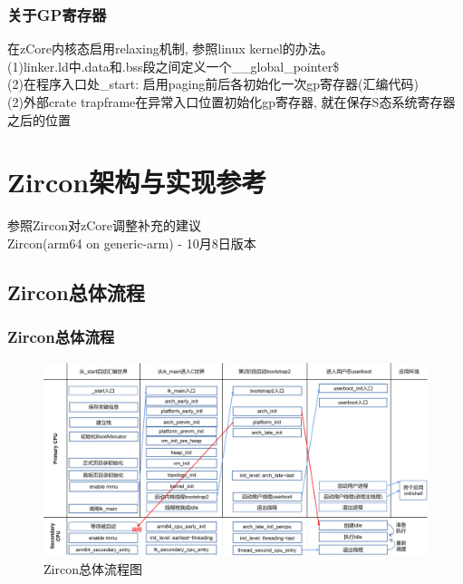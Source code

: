 \documentclass[
8pt, %
]{beamer}
\begin{document}
	\begin{frame}
		\frametitle{关于GP寄存器}
		在zCore内核态启用relaxing机制, 参照linux kernel的办法。\\
		(1)linker.ld中.data和.bss段之间定义一个\_\_global\_pointer\$\\
		(2)在程序入口处\_start: 启用paging前后各初始化一次gp寄存器(汇编代码)\\
		(2)外部crate trapframe在异常入口位置初始化gp寄存器, 就在保存S态系统寄存器之后的位置
        
        
	\end{frame}

	\section{Zircon架构与实现参考}

	\begin{frame}
		\begin{center}
			{\LARGE 参照Zircon对zCore调整补充的建议\\}
			\bigskip\bigskip
			{\large Zircon(arm64 on generic-arm) - 10月8日版本}
		\end{center}
	\end{frame}

	\subsection{Zircon总体流程}

	\begin{frame}
		\frametitle{Zircon总体流程}
		\begin{figure}
			\includegraphics[width=1.0\linewidth]{zircon_flow.png}
			\caption{Zircon总体流程图}
		\end{figure}
	\end{frame}
\end{document}
